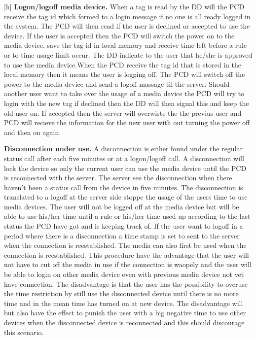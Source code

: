 \begin{center}[h]
\textbf{Logon/logoff media device.} \newline
When a tag is read by the DD will the PCD receive the tag id which formed to a login message if no one is all ready logged in the system. The PCD will then read if the user is declined or accepted to use the device. If the user is accepted then the PCD will switch the power on to the media device, save the tag id in local memory and receive time left before a rule or to time usage limit occur. The DD indicate to the user that he/she is approved to use the media device.\newline When the PCD receive the tag id that is stored in the local memory then it means the user is logging off. The PCD will switch off the power to the media device and send a logoff massage til the server. Should another user want to take over the usage of a media device the PCD will try to login with the new tag if declined then the DD will then signal this and keep the old user on. If accepted then the server will overwirte the the previus user and PCD will recieve the information for the new user with out turning the power off and then on again.\newline


\textbf{Disconnection under use.} \newline
A disconnection is either found under the regular status call after each five minutes or at a logon/logoff call. A disconnection will lock the device so only the current user can use the media device until the PCD is reconnected with the server. The server see the disconnection when there haven't been a status call from the device in five minutes. The disconnection is translated to a logoff at the server side stoppe the usage of the users time to use media devices. The user will not be logged off at the media device but will be able to use his/her time until a rule or his/her time used up according to the last status the PCD have got and is keeping track of. If the user want to logoff in a period where there is a disconnection a time stamp is set to sent to the server when the connection is reestablished. The media can also first be used when the connection is reestablished.   
This procedure have the advantage that the user will not have to cut off the media in use if the connection is waopely and the user will be able to login on other media device even with previous media device not yet have connection. 
The disadvantage is that the user has the possibility to overuse the time restriction by still use the disconnected device until there is no more time and in the mean time has turned on at new device. 
The disadvantage will but also have the effect to punish the user with a big negative time to use other devices when the disconnected device is reconnected and this should discourage this scenario.       
    

\end{center}
